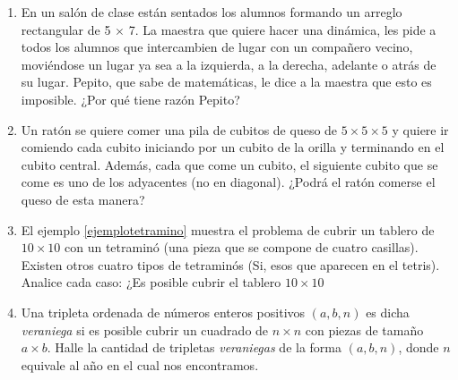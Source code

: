 \begin{enumerate}
	\item En un sal\'on de clase est\'an sentados los alumnos formando un arreglo rectangular de 5 $\times$ 7. La maestra
	que quiere hacer una din\'amica, les pide a todos los alumnos que intercambien de lugar con un compañero
	vecino, movi\'endose un lugar ya sea a la izquierda, a la derecha, adelante o atr\'as de su lugar. Pepito, que
	sabe de matem\'aticas, le dice a la maestra que esto es imposible. ¿Por qu\'e tiene raz\'on Pepito?
	\item Un rat\'on se quiere comer una pila de cubitos de queso de $5\times5\times5$ y quiere ir comiendo cada cubito iniciando por un cubito de la orilla y
	terminando en el cubito central. Adem\'as, cada que come un cubito, el siguiente cubito que se come es uno
	de los adyacentes (no en diagonal). ¿Podr\'a el rat\'on comerse el queso de esta manera?
	
	\item El ejemplo \ref{ejemplotetramino} muestra el problema de cubrir un tablero de $10\times 10$ con un tetramin\'o (una pieza que se compone de cuatro casillas). Existen otros cuatro tipos de tetramin\'os (Si, esos que aparecen en el tetris). Analice cada caso: ¿Es posible cubrir el tablero $10\times 10$
	
	\item Una tripleta ordenada de n\'umeros enteros positivos $(a, b, n)$ es dicha \textit{veraniega} si es posible cubrir un cuadrado de $n \times n$ con piezas de tamaño $a\times b$. Halle la cantidad de tripletas \textit{veraniegas} de la forma $(a, b, n)$, donde $n$ equivale al año en el cual nos encontramos.
\end{enumerate}
